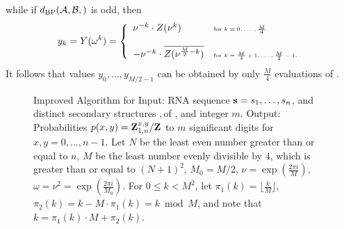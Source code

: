 while if $\dBP{\strA,\strB}$ is odd, then
\begin{align}
\label{eq:trickyRootsOfUnity2}
y_k = Y(\omega^k) = \left\{
\begin{array}{ll}
\nu^{-k} \cdot Z(\nu^k) &\mbox{\tiny for $k=0,\dots,\frac{M}{4}$}\\
\quad & \quad\\
-\nu^{-k} \cdot \overline{Z(\nu^{\frac{M}{2}-k})} &\mbox{\tiny for $k=\frac{M}{4}+1,\dots,\frac{M}{2}-1$.}\\
\end{array} \right.
\end{align}
It follows that values $y_0,\dots,y_{M/2-1}$ can be obtained by only
$\frac{M}{4}$ evaluations of \emZ{}.


\begin{figure}[!h]
\begin{small}
{\sc Improved Algorithm} for \ffttwo\hfill\break
{\sc Input:} RNA sequence ${\bf s}=s_1,\dots,s_n$, and distinct secondary
structures \strA,\,\strB of \seq, and integer $m$. \hfill\break
{\sc Output:} Probabilities $p(x,y)={\bf Z}^{x,y}_{1,n}/{\bf Z}^{}_{}$
to $m$ significant digits for $x,y=0,\dots,n-1$.
Let $N$ be the least even number greater than or equal
to $n$, $M$ be the least number evenly divisible by $4$, which is greater than
or equal to $(N+1)^2$, $M_0=M/2$, $\nu = \exp(\frac{2\pi i}{M})$,
$\omega=\nu^2= \exp(\frac{2\pi i}{M_0})$. For $0 \leq k < M^2$, let
$\pi_1(k) = \lfloor \frac{k}{M} \rfloor$,
$\pi_2(k) = k - M \cdot \pi_1(k) = k \bmod M$, and note that
$k=\pi_1(k)\cdot M + \pi_2(k)$.
\end{small}
\hfill\break
\smallskip
\begin{small}

\end{small}
\end{figure}

